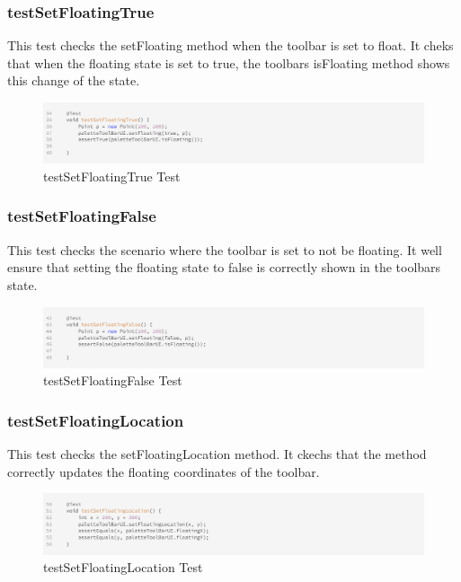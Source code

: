 \subsubsection{testSetFloatingTrue}
This test checks the setFloating method when the toolbar is set to float.
It cheks that when the floating state is set to true, the toolbars isFloating method shows this change of the state.

\begin{figure}[H]
    \centering
    \includegraphics[width=\linewidth]{pic/Test testSetFloatingTrue.png}
    \caption{testSetFloatingTrue Test}
    \label{fig:testSetFloatingTrue Test}
\end{figure}




\subsubsection{testSetFloatingFalse}
This test checks the scenario where the toolbar is set to not be floating.
It well ensure that setting the floating state to false is correctly shown in the toolbars state.

\begin{figure}[H]
    \centering
    \includegraphics[width=\linewidth]{pic/Test testSetFloatingFalse.png}
    \caption{testSetFloatingFalse Test}
    \label{fig:testSetFloatingFalse Test}
\end{figure}




\subsubsection{testSetFloatingLocation}
This test checks the setFloatingLocation method.
It ckechs that the method correctly updates the floating coordinates of the toolbar.

\begin{figure}[H]
    \centering
    \includegraphics[width=\linewidth]{pic/Test testSetFloatingLocation.png}
    \caption{testSetFloatingLocation Test}
    \label{fig:testSetFloatingLocation Test}
\end{figure}




